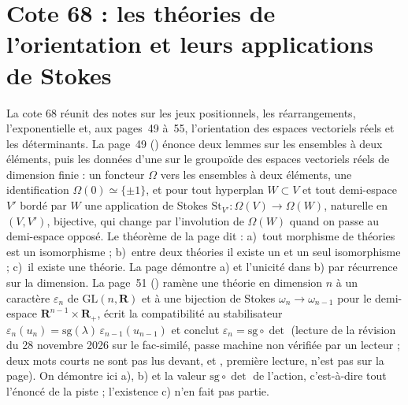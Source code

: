 \section[Cote 68 : les théories de l'orientation et leurs applications de Stokes]{Cote 68 : les théories de l'orientation et leurs applications de Stokes\protect{}}\label{sec:68}

La cote 68 réunit des notes sur les jeux positionnels, les réarrangements, l'exponentielle et, aux pages~49 à~55, l'orientation des espaces vectoriels réels et les déterminants. La page~49 () énonce deux lemmes sur les ensembles à deux éléments, puis les données d'une  sur le groupoïde des espaces vectoriels réels de dimension finie : un foncteur $\Omega$ vers les ensembles à deux éléments, une identification $\Omega(0) \simeq \{\pm 1\}$, et pour tout hyperplan $W \subset V$ et tout demi-espace $V'$ bordé par $W$ une application de Stokes $\mathrm{St}_{V'} : \Omega(V) \to \Omega(W)$, naturelle en $(V, V')$, bijective, qui change par l'involution de $\Omega(W)$ quand on passe au demi-espace opposé. Le théorème de la page dit : a)~tout morphisme de théories est un isomorphisme ; b)~entre deux théories il existe un et un seul isomorphisme ; c)~il existe une théorie. La page démontre a) et l'unicité dans b) par récurrence sur la dimension. La page~51 () ramène une théorie en dimension $n$ à un caractère $\varepsilon_n$ de $\mathrm{GL}(n, \mathbf R)$ et à une bijection de Stokes $\omega_n \to \omega_{n-1}$ pour le demi-espace $\mathbf R^{n-1} \times \mathbf R_+$, écrit la compatibilité au stabilisateur $\varepsilon_n(u_n) = \mathrm{sg}(\lambda)\,\varepsilon_{n-1}(u_{n-1})$ et conclut  $\varepsilon_n = \mathrm{sg} \circ \det$ (lecture de la révision du 28 novembre 2026 sur le fac-similé, passe machine non vérifiée par un lecteur ; deux mots courts ne sont pas lus devant, et , première lecture, n'est pas sur la page). On démontre ici a), b) et la valeur $\mathrm{sg} \circ \det$ de l'action, c'est-à-dire tout l'énoncé de la piste ; l'existence c) n'en fait pas partie.

